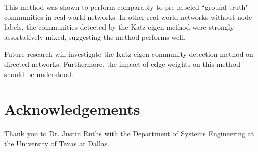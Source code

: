 \documentclass{IEEEtran}
\begin{document}
	This method was shown to perform comparably to pre-labeled ``ground truth" communities in real world networks. In other real world networks without node labels, the communities detected by the Katz-eigen method were strongly assortatively mixed, suggesting the method performs well.
	
	Future research will investigate the Katz-eigen community detection method on directed networks. Furthermore, the impact of edge weights on this method should be understood. 
	
	\section*{Acknowledgements}
	Thank you to \textellipsis
	Dr. Justin Ruths with the Department of Systems Engineering at the University of Texas at Dallas.
	\label{s:conc}
	
	
\end{document}
